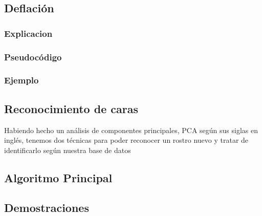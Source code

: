 \subsection{Deflaci\'on}
  \subsubsection{Explicacion}
  
  \subsubsection{Pseudoc\'odigo}
  
  \subsubsection{Ejemplo}
  

\subsection{Reconocimiento de caras}
Habiendo hecho un análisis de componentes principales, PCA según sus siglas en inglés, tenemos dos
técnicas para poder reconocer un rostro nuevo y tratar de identificarlo según nuestra base de datos
  


\subsection{Algoritmo Principal}


\newpage
\subsection{Demostraciones}

